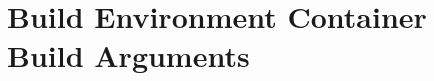 \chapter{Build Environment Container Build Arguments}\label{chap:build_args}

\newcommand{\buildarg}[3]{
    \section{#3}\label{sec:#1}
    Usage: \texttt{----build-arg #3=#2}\\
    }





